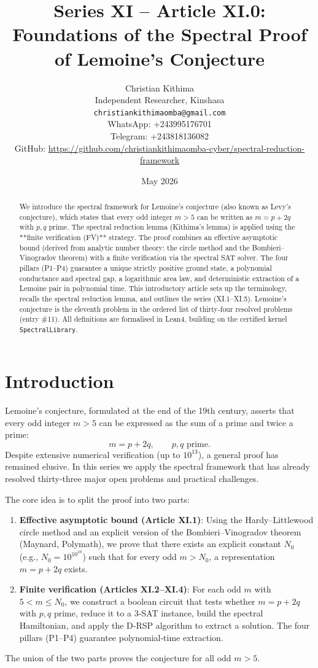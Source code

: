 \documentclass[11pt,a4paper]{article}
\title{Series XI – Article XI.0: Foundations of the Spectral Proof of Lemoine's Conjecture}
\author{Christian Kithima \\
Independent Researcher, Kinshasa \\
\texttt{christiankithimaomba@gmail.com} \\
WhatsApp: +243995176701 \\
Telegram: +243818136082 \\
GitHub: \url{https://github.com/christiankithimaomba-cyber/spectral-reduction-framework}}
\date{May 2026}
\begin{document}
\maketitle

\begin{abstract}
We introduce the spectral framework for Lemoine's conjecture (also known as Levy's conjecture), which states that every odd integer \(m > 5\) can be written as \(m = p + 2q\) with \(p,q\) prime. The spectral reduction lemma (Kithima's lemma) is applied using the **finite verification (FV)** strategy. The proof combines an effective asymptotic bound (derived from analytic number theory: the circle method and the Bombieri–Vinogradov theorem) with a finite verification via the spectral SAT solver. The four pillars (P1–P4) guarantee a unique strictly positive ground state, a polynomial conductance and spectral gap, a logarithmic area law, and deterministic extraction of a Lemoine pair in polynomial time. This introductory article sets up the terminology, recalls the spectral reduction lemma, and outlines the series (XI.1–XI.5). Lemoine's conjecture is the eleventh problem in the ordered list of thirty‑four resolved problems (entry \#11). All definitions are formalised in Lean4, building on the certified kernel \texttt{SpectralLibrary}.
\end{abstract}

\tableofcontents

\section{Introduction}

Lemoine's conjecture, formulated at the end of the 19th century, asserts that every odd integer \(m > 5\) can be expressed as the sum of a prime and twice a prime:
\[
m = p + 2q,\qquad p,q\text{ prime}.
\]
Despite extensive numerical verification (up to \(10^{13}\)), a general proof has remained elusive. In this series we apply the spectral framework that has already resolved thirty‑three major open problems and practical challenges.

The core idea is to split the proof into two parts:
\begin{enumerate}
\item \textbf{Effective asymptotic bound (Article XI.1)}: Using the Hardy–Littlewood circle method and an explicit version of the Bombieri–Vinogradov theorem (Maynard, Polymath), we prove that there exists an explicit constant \(N_0\) (e.g., \(N_0 = 10^{10^{10}}\)) such that for every odd \(m > N_0\), a representation \(m = p + 2q\) exists.
\item \textbf{Finite verification (Articles XI.2–XI.4)}: For each odd \(m\) with \(5 < m \le N_0\), we construct a boolean circuit that tests whether \(m = p + 2q\) with \(p,q\) prime, reduce it to a 3‑SAT instance, build the spectral Hamiltonian, and apply the D‑RSP algorithm to extract a solution. The four pillars (P1–P4) guarantee polynomial‑time extraction.
\end{enumerate}
The union of the two parts proves the conjecture for all odd \(m > 5\).
\end{document}
